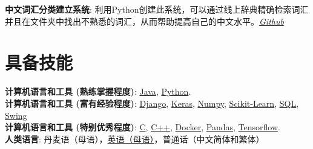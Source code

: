 \documentclass[margin]{res}
\begin{document}
\begin{CJK*}{UTF8}{gbsn}
\begin{resume}
\par
\textbf{中文词汇分类建立系统}: 
利用Python创建此系统，可以通过线上辞典精确检索词汇并且在文件夹中找出不熟悉的词汇，从而帮助提高自己的中文水平。\textit{\href{https://github.com/lucaskjaero/Chinese-Vocabulary-Finder}{Github}}




\section{具备技能}

\textbf{计算机语言和工具 (熟练掌握程度)}: \href{http://www.lucaskjaero.com/projects/tech/java/}{Java}, \href{http://www.lucaskjaero.com/projects/tech/python/}{Python}.
\\
\textbf{计算机语言和工具 (富有经验程度)}: \href{http://www.lucaskjaero.com/projects/tech/django/}{Django}, \href{http://www.lucaskjaero.com/projects/tech/keras/}{Keras}, \href{http://www.lucaskjaero.com/projects/tech/numpy/}{Numpy}, \href{http://www.lucaskjaero.com/projects/tech/sklearn/}{Scikit-Learn}, \href{http://www.lucaskjaero.com/projects/tech/postgresql/}{SQL}, \href{http://www.lucaskjaero.com/projects/tech/swing/}{Swing}
\\
\textbf{计算机语言和工具 (特别优秀程度)}: \href{http://www.lucaskjaero.com/projects/tech/c/}{C}, \href{http://www.lucaskjaero.com/projects/tech/cplusplus/}{C++}, \href{http://www.lucaskjaero.com/projects/tech/docker/}{Docker}, \href{http://www.lucaskjaero.com/projects/tech/pandas/}{Pandas}, \href{http://www.lucaskjaero.com/projects/tech/tensorflow/}{Tensorflow}.
\\
\textbf{人类语言}: 丹麦语（母语），\href{http://www.lucaskjaero.com/resume/}{英语（母语）}，普通话（中文简体和繁体）


\end{resume}
\end{CJK*}
\end{document}
